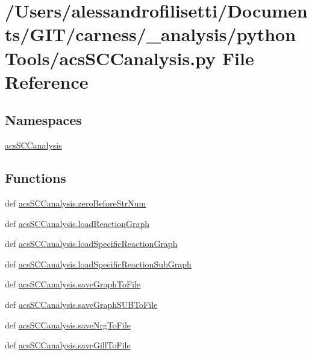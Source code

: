 \hypertarget{a00045}{\section{/\-Users/alessandrofilisetti/\-Documents/\-G\-I\-T/carness/\-\_\-analysis/python\-Tools/acs\-S\-C\-Canalysis.py File Reference}
\label{a00045}
}
\subsection*{Namespaces}
\begin{DoxyCompactItemize}
\item 
\hyperlink{a00128}{acs\-S\-C\-Canalysis}
\end{DoxyCompactItemize}
\subsection*{Functions}
\begin{DoxyCompactItemize}
\item 
def \hyperlink{a00128_ab46df2a2027edcf1b07fc012b691b9d6}{acs\-S\-C\-Canalysis.\-zero\-Before\-Str\-Num}
\item 
def \hyperlink{a00128_a4c179674ced261fa5a003a679647d7f3}{acs\-S\-C\-Canalysis.\-load\-Reaction\-Graph}
\item 
def \hyperlink{a00128_a7517a12f1c90a0ae0e997161079676bd}{acs\-S\-C\-Canalysis.\-load\-Specific\-Reaction\-Graph}
\item 
def \hyperlink{a00128_ab9d3c9c8514469b4dea42d8caacb3937}{acs\-S\-C\-Canalysis.\-load\-Specific\-Reaction\-Sub\-Graph}
\item 
def \hyperlink{a00128_abf8df0ca8eb1c3ae9aeb0b20813d93d2}{acs\-S\-C\-Canalysis.\-save\-Graph\-To\-File}
\item 
def \hyperlink{a00128_a5c959ea7dd3d2bd42004f1e5fd41f249}{acs\-S\-C\-Canalysis.\-save\-Graph\-S\-U\-B\-To\-File}
\item 
def \hyperlink{a00128_a541e9f38936fdf58fde0869521fdc5fc}{acs\-S\-C\-Canalysis.\-save\-Nrg\-To\-File}
\item 
def \hyperlink{a00128_ae6d4582e548a062fb38bf6aaa62e1558}{acs\-S\-C\-Canalysis.\-save\-Gill\-To\-File}
\end{DoxyCompactItemize}
